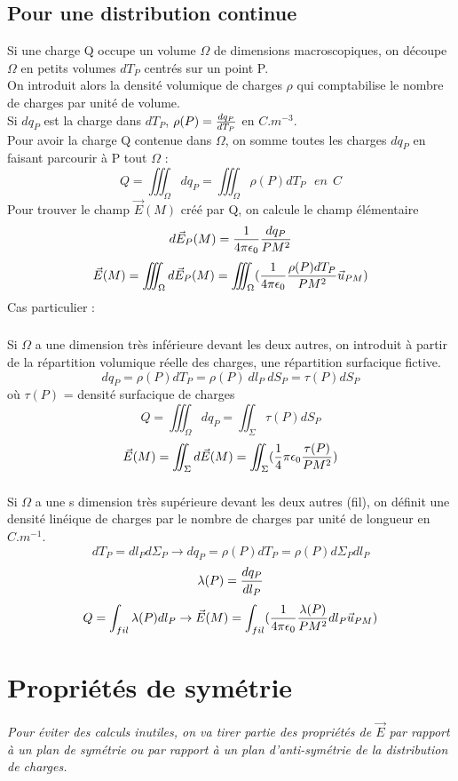 \documentclass[11pt,a4paper,french]{article}
\begin{document}
\subsection{Pour une distribution continue}
Si une charge Q occupe un volume $\Omega$ de dimensions macroscopiques, on découpe $\Omega$ en petits volumes $dT_P$ centrés sur un point P. \\
On introduit alors la densité volumique de charges $\rho$ qui comptabilise le nombre de charges par unité de volume. \\
Si $dq_P$ est la charge dans $dT_P$, $\rho(P) = {dq_P \over dT_P}$ en $C.m^{-3}$. \\
Pour avoir la charge Q contenue dans $\Omega$, on somme toutes les charges $dq_P$ en faisant parcourir à P tout $\Omega$ : 
$$Q = \iiint_\Omega dq_P =\iiint_\Omega \rho(P) dT_P ~~~ en~~ C$$
Pour trouver le champ $\vec E(M)$ créé par Q, on calcule le champ élémentaire
$$d \vec E_P(M) = {1 \over 4 \pi \epsilon_0}{dq_P \over PM^2}$$
$$\vec E(M) = \iiint_\Omega d\vec E_P(M) = \iiint_\Omega ({1 \over 4\pi\epsilon_0}{\rho(P)dT_P \over PM^2}\vec u_{PM})$$
\newpage
Cas particulier : \\
\subsubsection{} Si $\Omega$ a une dimension très inférieure devant les deux autres, on introduit à partir de la répartition volumique réelle des charges, une répartition surfacique fictive.
$$dq_P = \rho(P)dT_P = \rho(P)~dl_P~dS_P = \tau(P)dS_P$$
où $\tau(P)$  = densité surfacique de charges
$$Q = \iiint_\Omega dq_P = \iint_\Sigma \tau(P)dS_P$$
$$\vec E(M) = \iint_\Sigma d\vec E(M) = \iint_\Sigma ({1 \over 4}\pi \epsilon_0 {\tau(P) \over PM^2})$$
\subsubsection{} Si $\Omega$ a une s
dimension très supérieure devant les deux autres (fil), on définit une densité linéique de charges par le nombre de charges par unité de longueur en $C.m^{-1}$.
$$dT_P = dl_P d\Sigma_P \rightarrow dq_P = \rho(P)dT_P = \rho(P) d\Sigma_P dl_P$$
$$\lambda(P) = {dq_P \over dl_P}$$
$$Q = \int_{fil} \lambda(P)dl_P \rightarrow \vec E(M) = \int_{fil} ({1 \over 4 \pi \epsilon_0}{\lambda(P) \over PM^2} dl_P \vec u_{PM})$$
\newpage
\section{Propriétés de symétrie}
\textit{Pour éviter des calculs inutiles, on va tirer partie des propriétés de $\vec E$ par rapport à un plan de symétrie ou par rapport à un plan d'anti-symétrie de la distribution de charges.}
\end{document}
